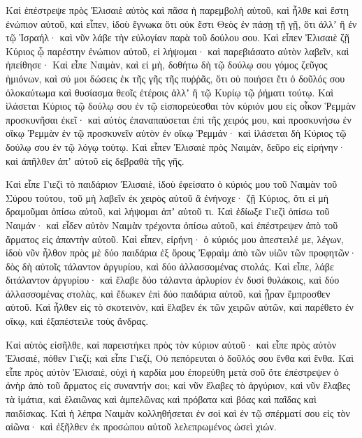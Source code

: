 {\par }{\PP {}Καὶ ἐπέστρεψε πρὸς Ἐλισαιὲ αὐτὸς καὶ πᾶσα ἡ παρεμβολὴ αὐτοῦ, καὶ ἦλθε καὶ ἔστη ἐνώπιον αὐτοῦ, καὶ εἶπεν, ἰδοὺ ἔγνωκα ὅτι οὐκ ἔστι Θεὸς ἐν πάσῃ τῇ γῇ, ὅτι ἀλλʼ ἢ ἐν τῷ Ἰσραήλ· καὶ νῦν λάβε τὴν εὐλογίαν παρὰ τοῦ δούλου σου.
Καὶ εἶπεν Ἐλισαιὲ ζῇ Κύριος ᾧ παρέστην ἐνώπιον αὐτοῦ, εἰ λήψομαι· καὶ παρεβιάσατο αὐτὸν λαβεῖν, καὶ ἠπείθησε·
Καὶ εἶπε Ναιμὰν, καὶ εἰ μὴ, δοθήτω δὴ τῷ δούλῳ σου γόμος ζεῦγος ἡμιόνων, καὶ σύ μοι δώσεις ἐκ τῆς γῆς τῆς πυῤῥᾶς, ὅτι οὐ ποιήσει ἔτι ὁ δοῦλός σου ὁλοκαύτωμα καὶ θυσίασμα θεοῖς ἑτέροις ἀλλʼ ἢ τῷ Κυρίῳ τῷ ῥήματι τούτῳ.
Καὶ ἱλάσεται Κύριος τῷ δούλῳ σου ἐν τῷ εἰσπορεύεσθαι τὸν κύριόν μου εἰς οἶκον Ῥεμμὰν προσκυνῆσαι ἐκεῖ· καὶ αὐτὸς ἐπαναπαύσεται ἐπὶ τῆς χειρός μου, καὶ προσκυνήσω ἐν οἴκῳ Ῥεμμὰν ἐν τῷ προσκυνεῖν αὐτὸν ἐν οἴκῳ Ῥεμμάν· καὶ ἱλάσεται δὴ Κύριος τῷ δούλῳ σου ἐν τῷ λόγῳ τούτῳ.
Καὶ εἶπεν Ἐλισαιὲ πρὸς Ναιμὰν, δεῦρο εἰς εἰρήνην· καὶ ἀπῆλθεν ἀπʼ αὐτοῦ εἰς δεβραθὰ τῆς γῆς.
\par }{\PP {}Καὶ εἶπε Γιεζὶ τὸ παιδάριον Ἐλισαιὲ, ἰδοὺ ἐφείσατο ὁ κύριός μου τοῦ Ναιμὰν τοῦ Σύρου τούτου, τοῦ μὴ λαβεῖν ἐκ χειρὸς αὐτοῦ ἃ ἐνήνοχε· ζῇ Κύριος, ὅτι εἰ μὴ δραμοῦμαι ὀπίσω αὐτοῦ, καὶ λήψομαι ἀπʼ αὐτοῦ τι.
Καὶ ἐδίωξε Γιεζὶ ὀπίσω τοῦ Ναιμάν· καὶ εἶδεν αὐτὸν Ναιμὰν τρέχοντα ὀπίσω αὐτοῦ, καὶ ἐπέστρεψεν ἀπὸ τοῦ ἅρματος εἰς ἀπαντὴν αὐτοῦ.
Καὶ εἶπεν, εἰρήνη· ὁ κύριός μου ἀπεστειλέ με, λέγων, ἰδοὺ νῦν ἦλθον πρὸς μὲ δύο παιδάρια ἐξ ὄρους Ἐφραὶμ ἀπὸ τῶν υἱῶν τῶν προφητῶν· δὸς δὴ αὐτοῖς τάλαντον ἀργυρίου, καὶ δύο ἀλλασσομένας στολάς.
Καὶ εἶπε, λάβε διτάλαντον ἀργυρίου· καὶ ἔλαβε δύο τάλαντα ἀρλυρίον ἐν δυσὶ θυλάκοις, καὶ δύο ἀλλασσομένας στολὰς, καὶ ἔδωκεν ἐπὶ δύο παιδάρια αὐτοῦ, καὶ ᾖραν ἔμπροσθεν αὐτοῦ.
Καὶ ἦλθεν εἰς τὸ σκοτεινὸν, καὶ ἔλαβεν ἐκ τῶν χειρῶν αὐτῶν, καὶ παρέθετο ἐν οἴκῳ, καὶ ἐξαπέστειλε τοὺς ἄνδρας.
\par }{\PP {}Καὶ αὐτὸς εἰσῆλθε, καὶ παρειστήκει πρὸς τὸν κύριον αὐτοῦ· καὶ εἶπε πρὸς αὐτὸν Ἐλισαιὲ, πόθεν Γιεζί; καὶ εἶπε Γιεζί, Οὐ πεπόρευται ὁ δοῦλός σου ἔνθα καὶ ἔνθα.
Καὶ εἶπε πρὸς αὐτὸν Ἐλισαιὲ, οὐχὶ ἡ καρδία μου ἐπορεύθη μετὰ σοῦ ὅτε ἐπέστρεψεν ὁ ἀνὴρ ἀπὸ τοῦ ἅρματος εἰς συναντήν σοι; καὶ νῦν ἔλαβες τὸ ἀργύριον, καὶ νῦν ἔλαβες τὰ ἱμάτια, καὶ ἐλαιῶνας καὶ ἀμπελῶνας καὶ πρόβατα καὶ βόας καὶ παῖδας καὶ παιδίσκας.
Καὶ ἡ λέπρα Ναιμὰν κολληθήσεται ἐν σοὶ καὶ ἐν τῷ σπέρματί σου εἰς τὸν αἰῶνα· καὶ ἐξῆλθεν ἐκ προσώπου αὐτοῦ λελεπρωμένος ὡσεὶ χιών.

}
